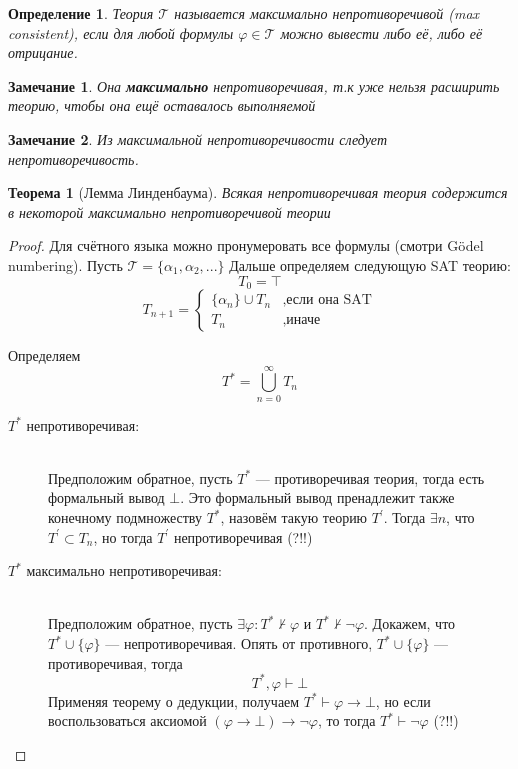 \documentclass[12pt]{article}
\newtheorem{theorem}{Теорема}
\newtheorem{definition}{Определение}
\newtheorem{remark}{Замечание}
\begin{document}
\begin{definition}
	Теория $\mathcal{T}$ называется максимально непротиворечивой (max consistent), если
	для любой формулы $\varphi \in \mathcal{T}$ можно вывести либо её, либо её отрицание.
\end{definition}

\begin{remark}
	Она \textbf{максимально} непротиворечивая, т.к уже нельзя расширить теорию, чтобы она ещё оставалось выполняемой
\end{remark}

\begin{remark}
	Из максимальной непротиворечивости следует непротиворечивость.
\end{remark}

\begin{theorem}[Лемма Линденбаума]
	Всякая непротиворечивая теория содержится в некоторой максимально непротиворечивой теории
\end{theorem}
\begin{proof}
	Для счётного языка можно пронумеровать все формулы (смотри Gödel numbering). Пусть $\mathcal{T} = \{\alpha_1, \alpha_2, ...\}$
	Дальше определяем следующую SAT теорию:
	\[
		T_0 = \top
	\]
	\[
		T_{n+1} =\begin{cases}
			\{\alpha_n\} \cup T_n & ,\text{если она SAT} \\
			T_n                   & ,\text{иначе}
		\end{cases}
	\]

	Определяем \[T^* = \bigcup\limits_{n=0}^{\infty}T_n\]

	\begin{description}
		\item[$T^* \text{ непротиворечивая:}$] \hfill \\
		      Предположим обратное, пусть $T^*$ --- противоречивая теория, тогда есть формальный вывод $\bot$. Это формальный вывод пренадлежит также конечному подмножеству $T^*$, назовём такую теорию $T^{\prime}$. Тогда $\exists n$, что $T^{\prime} \subset T_n$, но тогда $T^{\prime}$ непротиворечивая (?!!)
		\item[$T^* \text{ максимально непротиворечивая:}$] \hfill \\
		      Предположим обратное, пусть $\exists \varphi : T^* \nvdash \varphi$ и $T^* \nvdash \lnot \varphi$. Докажем, что $T^* \cup \{\varphi\}$ --- непротиворечивая. Опять от противного, $T^* \cup \{\varphi\}$ --- противоречивая, тогда \[T^*, \varphi \vdash \bot\]
		      Применяя теорему о дедукции, получаем $T^*\vdash \varphi \to \bot$, но если воспользоваться аксиомой
		      $(\varphi \to \bot) \to \lnot \varphi$, то тогда $T^*\vdash \lnot \varphi$ (?!!)
	\end{description}
\end{proof}
\end{document}
